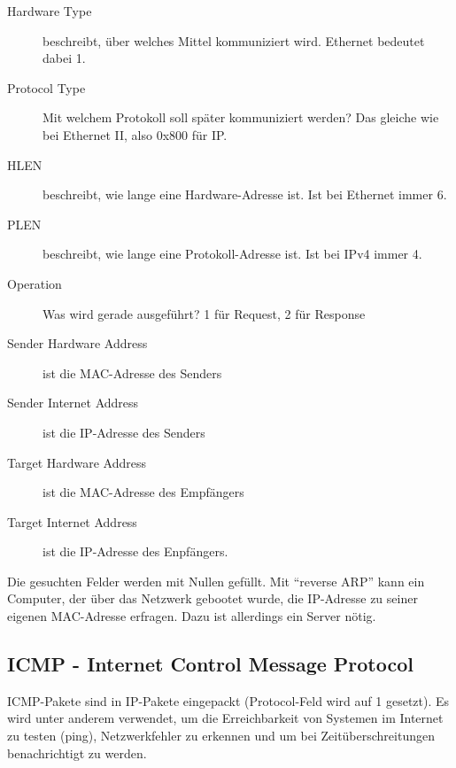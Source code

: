 \documentclass[a4paper,10pt]{scrartcl}
\begin{document}
        \begin{description}
            \item[Hardware Type] beschreibt, über welches Mittel kommuniziert wird. Ethernet bedeutet dabei 1.
            \item[Protocol Type] Mit welchem Protokoll soll später kommuniziert werden? Das gleiche wie bei Ethernet II, also 0x800 für IP.
            \item[HLEN] beschreibt, wie lange eine Hardware-Adresse ist. Ist bei Ethernet immer 6.
            \item[PLEN] beschreibt, wie lange eine Protokoll-Adresse ist. Ist bei IPv4 immer 4.
            \item[Operation] Was wird gerade ausgeführt? 1 für Request, 2 für Response
            \item[Sender Hardware Address] ist die MAC-Adresse des Senders
            \item[Sender Internet Address] ist die IP-Adresse des Senders
            \item[Target Hardware Address] ist die MAC-Adresse des Empfängers
            \item[Target Internet Address] ist die IP-Adresse des Enpfängers.
        \end{description}
        Die gesuchten Felder werden mit Nullen gefüllt. Mit “reverse ARP” kann ein Computer, der über das Netzwerk gebootet wurde, die IP-Adresse zu seiner eigenen MAC-Adresse erfragen. Dazu ist allerdings ein Server nötig.
    \subsection{ICMP - Internet Control Message Protocol}
        ICMP-Pakete sind in IP-Pakete eingepackt (Protocol-Feld wird auf 1 gesetzt). Es wird unter anderem verwendet, um  die Erreichbarkeit von Systemen im Internet zu testen (ping), Netzwerkfehler zu erkennen und um bei Zeitüberschreitungen benachrichtigt zu werden.\\
        
\end{document}
